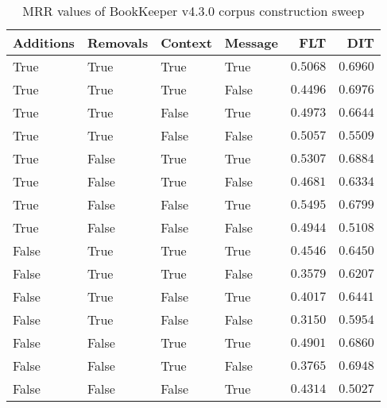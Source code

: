 
\begin{table}
\begin{spacing}{1.2}
\centering
\caption{MRR values of BookKeeper v4.3.0 corpus construction sweep}
\label{table:bookkeeper_corpus_sweep}
\vspace{0.2em}
\begin{tabular}{llll|rr}
\toprule
Additions & Removals & Context & Message & FLT &        DIT \\
\midrule
     True &     True &    True &    True &         $0.5068$ &      $0.6960$ \\
     True &     True &    True &   False &         $0.4496$ & $\bm{0.6976}$ \\
     True &     True &   False &    True &         $0.4973$ &      $0.6644$ \\
     True &     True &   False &   False &         $0.5057$ &      $0.5509$ \\
     True &    False &    True &    True &         $0.5307$ &      $0.6884$ \\
     True &    False &    True &   False &         $0.4681$ &      $0.6334$ \\
     True &    False &   False &    True &    $\bm{0.5495}$ &      $0.6799$ \\
     True &    False &   False &   False &         $0.4944$ &      $0.5108$ \\
    False &     True &    True &    True &         $0.4546$ &      $0.6450$ \\
    False &     True &    True &   False &         $0.3579$ &      $0.6207$ \\
    False &     True &   False &    True &         $0.4017$ &      $0.6441$ \\
    False &     True &   False &   False &         $0.3150$ &      $0.5954$ \\
    False &    False &    True &    True &         $0.4901$ &      $0.6860$ \\
    False &    False &    True &   False &         $0.3765$ &      $0.6948$ \\
    False &    False &   False &    True &         $0.4314$ &      $0.5027$ \\
\bottomrule
\end{tabular}

\end{spacing}
\end{table}
